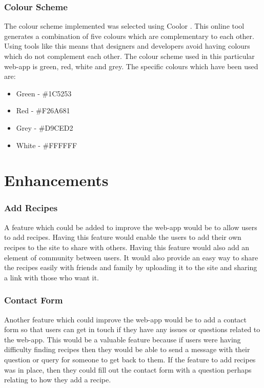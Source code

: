 \documentclass[10pt, a4paper]{article}
\begin{document}
	\subsubsection{Colour Scheme}
    The colour scheme implemented was selected using Coolor \cite{Color}. This online tool generates a combination of five colours which are complementary to each other. Using tools like this means that designers and developers avoid having colours which do not complement each other. The colour scheme used in this particular web-app is green, red, white and grey. The specific colours which have been used are: \begin{itemize}
        \item Green - \#1C5253
        \item Red - \#F26A681
        \item Grey - \#D9CED2
        \item White - \#FFFFFF
        \end{itemize}

    \section{Enhancements}
    \subsubsection{Add Recipes}
    A feature which could be added to improve the web-app would be to allow users to add recipes. Having this feature would enable the users to add their own recipes to the site to share with others. Having this feature would also add an element of community between users. It would also provide an easy way to share the recipes easily with friends and family by uploading it to the site and sharing a link with those who want it. 
    
    \subsubsection{Contact Form}
    Another feature which could improve the web-app would be to add a contact form so that users can get in touch if they have any issues or questions related to the web-app. This would be a valuable feature because if users were having difficulty finding recipes then they would be able to send a message with their question or query for someone to get back to them.  If the feature to add recipes was in place, then they could fill out the contact form with a question perhaps relating to how they add a recipe.
    
\end{document}
